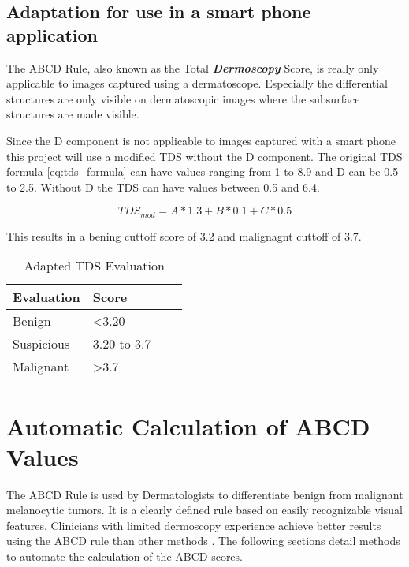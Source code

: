 \subsection{Adaptation for use in a smart phone application}

The ABCD Rule, also known as the Total \textbf{\textit{Dermoscopy}} Score, is really only applicable to images captured using a dermatoscope. Especially the differential structures are only visible on dermatoscopic images where the subsurface structures are made visible\cite{Fernandez_Alcon_2009}.

Since the D component is not applicable to images captured with a smart phone this project will use a modified TDS without the D component. The original TDS formula \ref{eq:tds_formula} can have values ranging from 1 to 8.9 and D can be 0.5 to 2.5. Without D  the TDS can have values between 0.5 and 6.4.

\begin{equation}
\label{eq:tds_modified}
TDS_{mod} = A * 1.3 + B * 0.1 + C * 0.5
\end{equation}

This results in a bening cuttoff score of 3.2 and malignagnt cuttoff of 3.7.

\begin{table}[H]
\centering
\small
    \begin{tabular}{ | l | p{3.5cm} | l | p{3.5cm} |}
    \hline
    Evaluation & Score \\ \hline
    Benign & \textless  3.20  \\ \hline
    Suspicious & 3.20 to 3.7  \\ \hline
    Malignant & \textgreater  3.7  \\ \hline

    \end{tabular}

    \caption{Adapted TDS Evaluation}
    \label{fig:tds_mod_eval}

\end{table}


\section{Automatic Calculation of ABCD Values}

The ABCD Rule is used by Dermatologists to differentiate benign from malignant melanocytic tumors. It is a clearly defined rule based on easily recognizable visual features. Clinicians with limited dermoscopy experience achieve better results using the ABCD rule than other methods \cite{Weigert_2012}. The following sections detail methods to automate the calculation of the ABCD scores.

